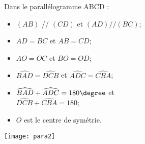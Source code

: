 	\begin{myex}
		\begin{multicols}{2}
			Dans le parallélogramme ABCD :
			\begin{itemize}
				\item $(AB)$ // $(CD)$ et $(AD) // (BC)$;
				\item $AD = BC$ et $AB = CD$;
				\item $AO = OC$ et $BO = OD$;
				\item $\widehat{BAD} = \widehat{DCB}$ et $\widehat{ADC} = \widehat{CBA}$;
				\item $\widehat{BAD} + \widehat{ADC} = 180\degree$  et \\ $\widehat{DCB} + \widehat{CBA} = 180$\degree;
				\item $O$ est le centre de symétrie.
			\end{itemize}
			
			
			
			\begin{center}
				\texttt{[image: para2]}
			\end{center}
		\end{multicols}
	\end{myex}